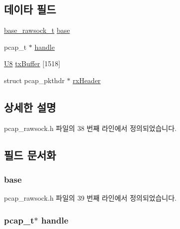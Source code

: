 \subsection*{데이타 필드}
\begin{DoxyCompactItemize}
\item 
\hyperlink{rawsock__impl_8h_ac539cdabcfe438f13001a289f222e6a2}{base\+\_\+rawsock\+\_\+t} \hyperlink{structpcap__rawsock__t_a1507c5af4508d59cb0a730a852763e94}{base}
\item 
pcap\+\_\+t $\ast$ \hyperlink{structpcap__rawsock__t_a6c138155d7b3442efd19d0aa3f93e548}{handle}
\item 
\hyperlink{openavb__types__base__pub_8h_aa63ef7b996d5487ce35a5a66601f3e73}{U8} \hyperlink{structpcap__rawsock__t_a7661fa3516bae1bdfe2000e2dea164ae}{tx\+Buffer} \mbox{[}1518\mbox{]}
\item 
struct pcap\+\_\+pkthdr $\ast$ \hyperlink{structpcap__rawsock__t_ae6451f27abf3b4dcac75da87d87d5a8c}{rx\+Header}
\end{DoxyCompactItemize}


\subsection{상세한 설명}


pcap\+\_\+rawsock.\+h 파일의 38 번째 라인에서 정의되었습니다.



\subsection{필드 문서화}
\subsubsection[{\texorpdfstring{base}{base}}]{ base}\hypertarget{structpcap__rawsock__t_a1507c5af4508d59cb0a730a852763e94}{}\label{structpcap__rawsock__t_a1507c5af4508d59cb0a730a852763e94}


pcap\+\_\+rawsock.\+h 파일의 39 번째 라인에서 정의되었습니다.

\subsubsection[{\texorpdfstring{handle}{handle}}]{\setlength{\rightskip}{0pt plus 5cm}pcap\+\_\+t$\ast$ handle}\hypertarget{structpcap__rawsock__t_a6c138155d7b3442efd19d0aa3f93e548}{}\label{structpcap__rawsock__t_a6c138155d7b3442efd19d0aa3f93e548}


